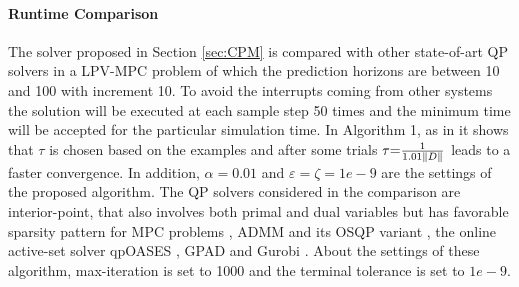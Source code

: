 \documentclass[journal]{IEEEtran}
\begin{document}
\paragraph{Runtime Comparison}{The solver proposed in Section \ref{sec:CPM} is compared with other state-of-art QP solvers in a LPV-MPC problem of which the prediction horizons are between 10 and 100 with increment 10. To avoid the interrupts coming from other systems the solution will be executed at each sample step 50 times and the minimum time will be accepted for the particular simulation time. In Algorithm 1, as in \cite{patrinos2011global} it shows that $\tau $ is chosen based on the examples and after some trials $\tau {\rm{ = }}\frac{1}{{{\rm{1}}{\rm{.01}}\left\| D \right\|}}$ leads to a faster convergence. In addition, $\alpha  = 0.01$ and $\varepsilon  = \zeta  = 1e - 9$ are the settings of the proposed algorithm. The QP solvers considered in the comparison are interior-point, that also involves both primal and dual variables but has favorable sparsity pattern for MPC problems \cite{wang2010fast}, ADMM \cite{boyd2011distributed} and its OSQP variant \cite{osqp-infeasibility}, the online active-set solver qpOASES \cite{ferreau2014qpoases}, GPAD \cite{patrinos2014accelerated} and Gurobi \cite{gurobi2011gurobi}. About the settings of these algorithm, max-iteration is set to 1000 and the terminal tolerance is set to $ 1e - 9 $.}
\end{document}
